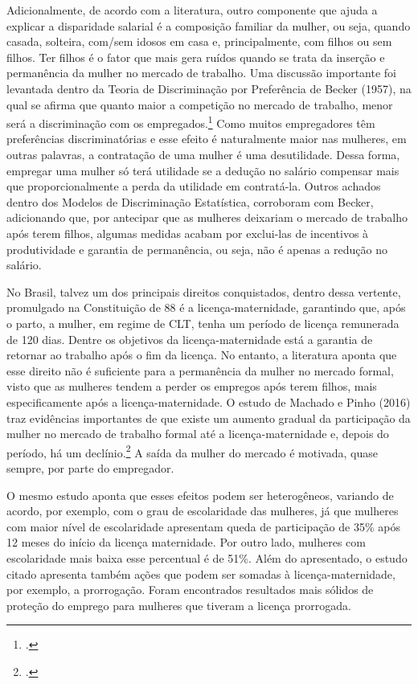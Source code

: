 \documentclass[12pt]{article}
\begin{document}
\par Adicionalmente, de acordo com a literatura, outro componente que ajuda a explicar a disparidade salarial é a composição familiar da mulher, ou seja, quando casada, solteira, com/sem idosos em casa e, principalmente, com filhos ou sem filhos. Ter filhos é o fator que mais gera ruídos quando se trata da inserção e permanência da mulher no mercado de trabalho. Uma discussão importante foi levantada dentro da Teoria de Discriminação por Preferência de Becker (1957), na qual se afirma que quanto maior a competição no mercado de trabalho, menor será a discriminação com os empregados.\footcite{becker1957} Como muitos empregadores têm preferências discriminatórias e esse efeito é naturalmente maior nas mulheres, em outras palavras, a contratação de uma mulher é uma desutilidade. Dessa forma, empregar uma mulher só terá utilidade se a dedução no salário compensar mais que proporcionalmente a perda da utilidade em contratá-la. Outros achados dentro dos Modelos de Discriminação Estatística, corroboram com Becker, adicionando que, por antecipar que as mulheres deixariam o mercado de trabalho após terem filhos, algumas medidas acabam por exclui-las de incentivos à produtividade e garantia de permanência, ou seja, não é apenas a redução no salário.


\par No Brasil, talvez um dos principais direitos conquistados, dentro dessa vertente, promulgado na Constituição de 88 é a licença-maternidade, garantindo que, após o parto, a mulher, em regime de CLT, tenha um período de licença remunerada de 120 dias. Dentre os objetivos da licença-maternidade está a garantia de retornar ao trabalho após o fim da licença. No entanto, a literatura aponta que esse direito não é suficiente para a permanência da mulher no mercado formal, visto que as mulheres tendem a perder os empregos após terem filhos, mais especificamente após a licença-maternidade. O estudo de Machado e Pinho (2016) traz evidências importantes de que existe um aumento gradual da participação da mulher no mercado de trabalho formal até a licença-maternidade e, depois do período, há um declínio.\footcite[]{machadoandpinho2016} A saída da mulher do mercado é motivada, quase sempre, por parte do empregador. 

\par O mesmo estudo aponta que esses efeitos podem ser heterogêneos, variando de acordo, por exemplo, com o grau de escolaridade das mulheres, já que mulheres com maior nível de escolaridade apresentam queda de participação de 35\% após 12 meses do início da licença maternidade. Por outro lado, mulheres com escolaridade mais baixa esse percentual é de 51\%. Além do apresentado, o estudo citado apresenta também ações que podem ser somadas à licença-maternidade, por exemplo, a prorrogação. Foram encontrados resultados mais sólidos de proteção do emprego para mulheres que tiveram a licença prorrogada.
\end{document}

